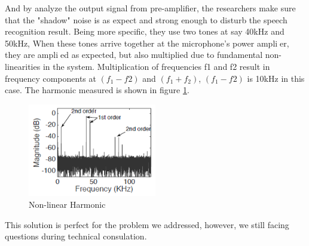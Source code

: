 \documentclass[12pt,twoside]{article}
\begin{document}
And by analyze the output signal from pre-amplifier, the researchers make sure that the "shadow" noise is as expect and strong enough to disturb the speech 
recognition result. Being more specific, they use two tones at say 40kHz and 50kHz, When these tones arrive together at the microphone's power amplier,
they are amplied as expected, but also multiplied due to fundamental non-linearities in the system. Multiplication of frequencies f1 and f2 result in frequency 
components at $(f_1-f2)$ and $(f_1+f_2)$,  $(f_1-f2)$ is 10kHz in this case. The harmonic measured is shown in figure \ref{fig:Non-linear Harmonic}.

\begin{figure}[!htb]
\centering
\includegraphics[width=0.5\textwidth]{freq.png}
\caption{Non-linear Harmonic}
\label{fig:Non-linear Harmonic}
\end{figure}

This solution is perfect for the problem we addressed, however, we still facing questions during technical consulation.
\end{document}
